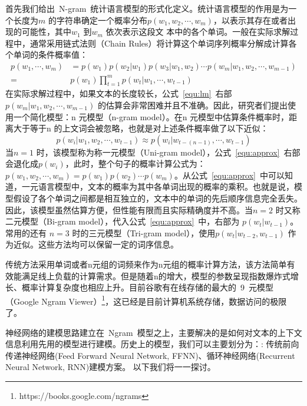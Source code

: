 首先我们给出~N-gram~统计语言模型的形式化定义。统计语言模型的作用是为一个长度为$m$ 的字符串确定一个概率分布$p(w_1,w_2,\cdots,w_m)$，以表示其存在或者出现的可能性，其中$w_1$ 到$w_m$ 依次表示这段文
本中的各个单词。一般在实际求解过程中，通常采用链式法则（Chain Rules）将计算这个单词序列概率分解成计算各个单词的条件概率值：
\begin{equation}
\label{equ:lm}
\begin{split}
p(w_1,\cdots,w_m) &= p(w_1) p(w_2|w_1) p(w_3|w_1,w_2)\cdots p(w_m | w_1,w_2,\cdots,w_{m-1}) \\
=&p(w_1)\prod_{t=1}^{m}p(w_t|w_1,\cdots,w_{t-1})
\end{split}
\end{equation}
在实际求解过程中，如果文本的长度较长，公式~\ref{equ:lm}~右部$ p(w_m | w_1,w_2,\cdots,w_{m-1}) $ 的估算会非常困难并且不准确。因此，研究者们提出使用一个简化模型：n 元模型（n-gram model）。在n 元模型中估算条件概率时，距离大于等于n 的上文词会被忽略，也就是对上述条件概率做了以下近似：
\begin{equation}
\label{equ:approx}
p(w_i | w_1,w_2,\cdots,w_{t-1})  \approx p(w_i | w_{t-(n-1)},\cdots,w_{t-1})
\end{equation}
当$n = 1$ 时，该模型称为称一元模型（Uni-gram model），公式~\ref{equ:approx}~右部会退化成$p(w_i)$，此时，整个句子的概率计算公式为：$p(w_1,w_2,\cdots,w_m) = p(w_1)p(w_2) \cdots p(w_m)$。从公式~\ref{equ:approx}~中可以知道，一元语言模型中，文本的概率为其中各单词出现的概率的乘积。也就是说，模型假设了各个单词之间都是相互独立的，文本中的单词的先后顺序信息完全丢失。因此，该模型虽然估算方便，但性能有限而且实际精确度并不高。当$n = 2$ 时又称二元模型（Bi-gram model），代入公式~\ref{equ:approx}~中，右部为 $p(w_t|w_{t-1})$。常用的还有 $n = 3$ 时的三元模型（Tri-gram model），使用$p(w_t |w_{t-2},w_{t-1})$ 作为近似。这些方法均可以保留一定的词序信息。

传统方法采用单词或者n元组的词频来作为n元组的概率计算方法，该方法简单有效能满足线上负载的计算需求。但是随着n的增大，模型的参数呈现指数爆炸式增长、概率计算复杂度也相应上升。目前谷歌有在线存储的最大的~9~元模型（Google Ngram Viewer）\footnote{https://books.google.com/ngrams}，这已经是目前计算机系统存储，数据访问的极限了。


神经网络的建模思路建立在~Ngram~模型之上，主要解决的是如何对文本的上下文信息利用先用的模型进行建模。历史上的模型，我们可以主要划分为：: 传统前向传递神经网络(Feed Forward Neural Network, FFNN)、循环神经网络(Recurrent Neural Network, RNN)建模方案。 以下我们将一一探讨。


